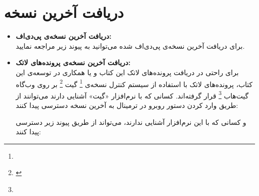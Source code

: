 \chapter*{دریافت آخرین نسخه}
\begin{itemize}
\item \textbf{دریافت آخرین نسخه‌ی پی‌دی‌اف:} \\
 برای دریافت آخرین نسخه‌ی پی‌دی‌اف شده می‌توانید به پیوند زیر مراجعه نمایید.
\begin{url-address}

\end{url-address}
\item \textbf{دریافت آخرین نسخه‌ی پرونده‌های لاتک:} \\
برای راحتی در دریافت پرونده‌های لاتک این کتاب و یا همکاری در توسعه‌ی این کتاب، پرونده‌های لاتک با استفاده از سیستم کنترل نسخه‌ی
\footnote{}
گیت
\footnote{‌}
بر روی وب‌گاه گیت‌هاب
\footnote{}
قرار گرفته‌اند. کسانی که با نرم‌افزار «گیت» آشنایی دارند می‌توانند از طریق وارد کردن دستور روبرو در ترمینال به آخرین نسخه دسترسی پیدا کنند:
\begin{latin}

\end{latin}
و کسانی که با این نرم‌افزار آشنایی ندارند، می‌تواند از طریق پیوند زیر دسترسی پیدا کنند:
\begin{url-address}

\end{url-address}
 
\end{itemize}